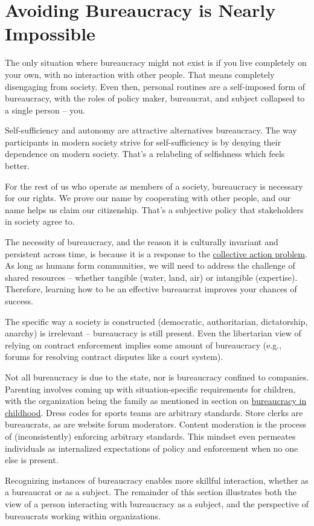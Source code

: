 \section{Avoiding Bureaucracy is Nearly Impossible}

The only situation where bureaucracy might not exist is if you live completely on your own, with no interaction with other people. That means completely disengaging from society. Even then, personal routines are a self-imposed form of bureaucracy, with the roles of policy maker, bureaucrat, and subject collapsed to a single person -- you.

Self-sufficiency and autonomy are attractive alternatives bureaucracy. The way participants in modern society strive for self-sufficiency is by denying their dependence on modern society. That's a relabeling of selfishness which feels better. 

For the rest of us who operate as members of a society, bureaucracy is necessary for our rights. We prove our name by cooperating with other people, and our name helps us claim our citizenship. That's a subjective policy that \glspl{stakeholder} in society agree to. 

The necessity of bureaucracy, and the reason it is culturally invariant and persistent across time, is because it is a response to the 
\href{https://en.wikipedia.org/wiki/Collective_action_problem}{collective action problem}. As long as humans form communities, we will need to address the challenge of shared resources -- whether tangible (water, land, air) or intangible (expertise). Therefore, learning how to be an effective bureaucrat improves your chances of success. 

The specific way a society is constructed (democratic, authoritarian, dictatorship, anarchy) is irrelevant -- bureaucracy is still present. Even the libertarian view of relying on contract enforcement implies some amount of bureaucracy (e.g., forums for resolving contract disputes like a court system). 


Not all bureaucracy is due to the state, nor is bureaucracy confined to companies. Parenting involves coming up with situation-specific requirements for children, with the organization being the family as mentioned in section 
on \hyperref[sec:bureaucracy-early-childhood]{bureaucracy in childhood}.
Dress codes for sports teams are arbitrary standards. 
Store clerks are bureaucrats, as are website forum moderators.  Content moderation is the process of (inconsistently) enforcing arbitrary standards. This mindset even permeates individuals as internalized expectations of policy and enforcement when no one else is present. 

Recognizing instances of bureaucracy enables more skillful interaction, whether as a bureaucrat or as a subject. The remainder of this section  illustrates both the view of a person interacting with bureaucracy as a \gls{subject}, and the perspective of bureaucrats working within organizations. 




